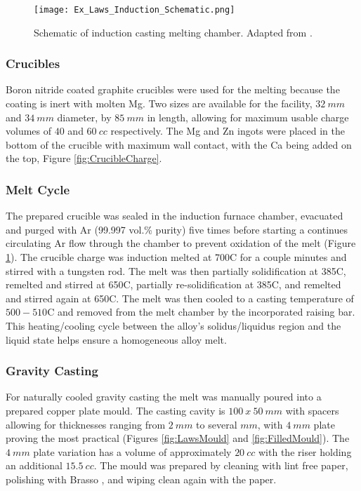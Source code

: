 \documentclass[a4paper,12pt,oneside]{report}%
\begin{document}
\begin{figure}[htbp]
	\centering
	\texttt{[image: Ex\_Laws\_Induction\_Schematic.png]}
	\caption[Schematic of induction casting melting chamber.]{Schematic of induction casting melting chamber. Adapted from \cite{Laws2007}.}
	\label{fig:CastingSchematic}
\end{figure}

\subsubsection{Crucibles}
Boron nitride coated graphite crucibles were used for the melting because the coating is inert with molten Mg. Two sizes are available for the facility, $32~ mm$ and $34~ mm$ diameter, by $85~ mm$ in length, allowing for maximum usable charge volumes of $40$ and $60~ cc$ respectively. The Mg and Zn ingots were placed in the bottom of the crucible with maximum wall contact, with the Ca being added on the top, Figure \ref{fig:CrucibleCharge}.

\subsubsection{Melt Cycle}
The prepared crucible was sealed in the induction furnace chamber, evacuated and purged with Ar (99.997 vol.\% purity) five times before starting a continues circulating Ar flow through the chamber to prevent oxidation of the melt (Figure \ref{fig:CastingSchematic}). The crucible charge was induction melted at 700\degree C for a couple minutes and stirred with a tungsten rod. The melt was then partially solidification at 385\degree C, remelted and stirred at 650\degree C, partially re-solidification at 385\degree C, and remelted and stirred again at 650\degree C. The melt was then cooled to a casting temperature of $500- 510$\degree C and removed from the melt chamber by the incorporated raising bar. This heating/cooling cycle between the alloy's solidus/liquidus region and the liquid state helps ensure a homogeneous alloy melt. 

\subsubsection{Gravity Casting}
For naturally cooled gravity casting the melt was manually poured into a prepared copper plate mould. The casting cavity is $100~ x~ 50~ mm$ with spacers allowing for thicknesses ranging from $2~ mm$ to several $mm$, with $4~ mm$ plate proving the most practical (Figures \ref{fig:LawsMould} and \ref{fig:FilledMould}). The $4~ mm$ plate variation has a volume of approximately $20~ cc$ with the riser holding an additional $15.5~ cc$. The mould was prepared by cleaning with lint free paper, polishing with Brasso \textcopyright, and wiping clean again with the paper.
\end{document}
